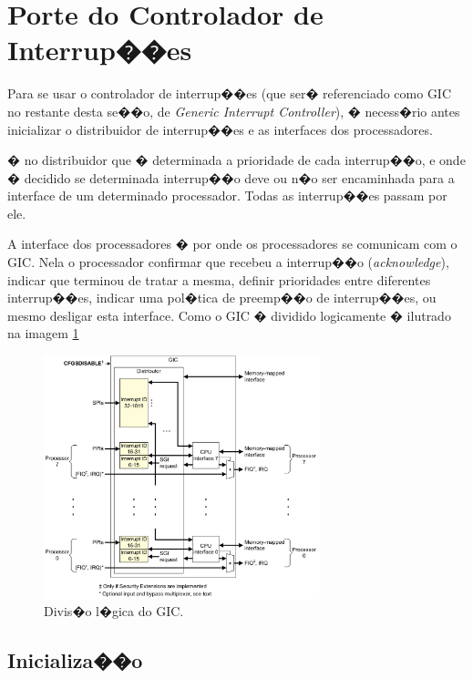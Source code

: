 \documentclass{ufscThesis/ufscThesis} %
\begin{document}
\section{Porte do Controlador de Interrup��es}


Para se usar o controlador de interrup��es (que ser� referenciado como GIC no restante desta se��o, de \emph{Generic Interrupt Controller}), � necess�rio antes inicializar o distribuidor de interrup��es e as interfaces dos processadores.

� no distribuidor que � determinada a prioridade de cada interrup��o, e onde � decidido se determinada interrup��o deve ou n�o ser encaminhada para a interface de um determinado processador. Todas as interrup��es passam por ele.

A interface dos processadores � por onde os processadores se comunicam com o GIC. Nela o processador confirmar que recebeu a interrup��o (\emph{acknowledge}), indicar que terminou de tratar a mesma, definir prioridades entre diferentes interrup��es, indicar uma pol�tica de preemp��o de interrup��es, ou mesmo desligar esta interface. Como o GIC � dividido logicamente � ilutrado na imagem \ref{img:gic}

\begin{figure}[ht!]
    \centering
    \includegraphics[width=8cm]{figuras/gic}
    \caption{Divis�o l�gica do GIC.}
    \label{img:gic}
\end{figure}

\subsection{Inicializa��o}
\end{document}
